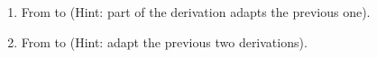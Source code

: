 \begin{enumerate}
 \opts{

  \dotline
  \dotline
  \dotline
  \dotline
  \dotline
  \dotline
  \dotline
  \dotline
  \dotline
  \dotline
  \dotline
  \dotline

 }
 {

\begin{argumentN}[1]





\end{argumentN}

}

\item 

 From  to  (Hint: part of the derivation adapts the previous one).


 \opts{

  \dotline
  \dotline
  \dotline
  \dotline
  \dotline
  \dotline
  \dotline
  \dotline
  \dotline
  \dotline
  \dotline
  \dotline

 }
 {
\begin{argumentN}[1]








\end{argumentN}
}

\newpage
\item From  to 
  (Hint: adapt the previous two derivations).

 \opts{

  \dotline
  \dotline
  \dotline
  \dotline
  \dotline
  \dotline
  \dotline
  \dotline
  \dotline
  \dotline
  \dotline
  \dotline

 }
 {
\begin{argumentN}[1]


\end{argumentN}}
\end{enumerate}
